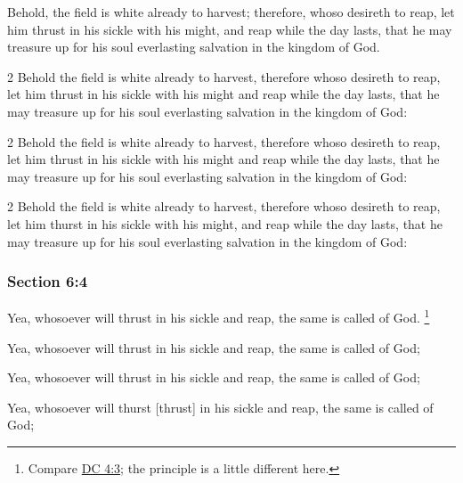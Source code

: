		Behold, the field is white already to harvest; therefore, whoso desireth to reap, let him thrust in his sickle with his might, and reap while the day lasts, that he may treasure up for his soul everlasting salvation in the kingdom of God.

		\begin{framed}
		\scriptsize
			\begin{compactdesc}
				\item[JSP] 2 Behold the field is white already to harvest, therefore whoso desireth to reap, let him thrust in his sickle with his might and reap while the day lasts, that he may treasure up for his soul everlasting salvation in the kingdom of God: 
				\item[DC 1835] 2 Behold the field is white already to harvest, therefore whoso desireth to reap, let him thrust in his sickle with his might and reap while the day lasts, that he may treasure up for his soul everlasting salvation in the kingdom of God:
				\item[DC 1844] 2 Behold the field is white already to harvest, therefore whoso desireth to reap, let him thurst in his sickle with his might, and reap while the day lasts, that he may treasure up for his soul everlasting salvation in the kingdom of God:
			\end{compactdesc}
		\end{framed}

	\subsubsection{Section 6:4} %
		\label{DC6-4}

		Yea, whosoever will thrust in his sickle and reap, the same is called of God.%
			\footnote{%
				Compare \hyperref[DC4-3]{DC 4:3}; the principle is a little different here.
				}

		\begin{framed}
		\scriptsize
			\begin{compactdesc}
				\item[JSP] Yea, whosoever will thrust in his sickle and reap, the same is called of God; 
				\item[DC 1835] Yea, whosoever will thrust in his sickle and reap, the same is called of God;
				\item[DC 1844] Yea, whosoever will thurst [thrust] in his sickle and reap, the same is called of God; 
			\end{compactdesc}
		\end{framed}


